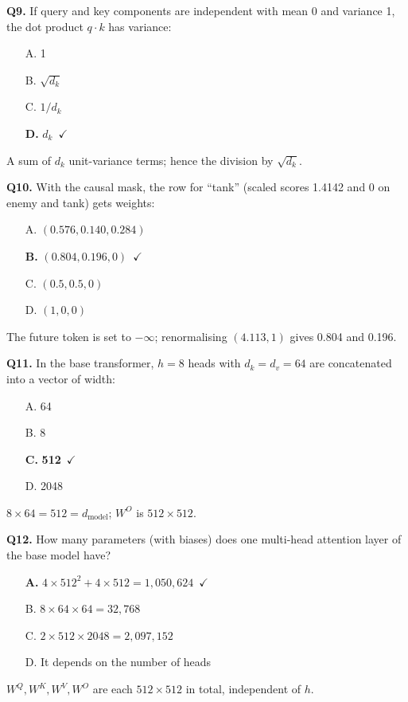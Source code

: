 \documentclass[11pt]{article}
\begin{document}
{\noindent\textbf{Q9.} If query and key components are independent with mean 0 and variance 1, the dot product $q\cdot k$ has variance:\begin{itemize}[leftmargin=2.2em,itemsep=0pt,topsep=1pt]\item[A.] 1\item[B.] $\sqrt{d_k}$\item[C.] $1/d_k$\item[\textbf{D.}] \textbf{$d_k$}~{\color{GrnN}$\checkmark$}\end{itemize} A sum of $d_k$ unit-variance terms; hence the division by $\sqrt{d_k}$.\par\medskip

\noindent\textbf{Q10.} With the causal mask, the row for ``tank'' (scaled scores 1.4142 and 0 on enemy and tank) gets weights:\begin{itemize}[leftmargin=2.2em,itemsep=0pt,topsep=1pt]\item[A.] $(0.576,0.140,0.284)$\item[\textbf{B.}] \textbf{$(0.804,0.196,0)$}~{\color{GrnN}$\checkmark$}\item[C.] $(0.5,0.5,0)$\item[D.] $(1,0,0)$\end{itemize} The future token is set to $-\infty$; renormalising $(4.113,1)$ gives 0.804 and 0.196.\par\medskip

\noindent\textbf{Q11.} In the base transformer, $h=8$ heads with $d_k=d_v=64$ are concatenated into a vector of width:\begin{itemize}[leftmargin=2.2em,itemsep=0pt,topsep=1pt]\item[A.] 64\item[B.] 8\item[\textbf{C.}] \textbf{512}~{\color{GrnN}$\checkmark$}\item[D.] 2048\end{itemize} $8\times64=512=d_{\text{model}}$; $W^O$ is $512\times512$.\par\medskip

\noindent\textbf{Q12.} How many parameters (with biases) does one multi-head attention layer of the base model have?\begin{itemize}[leftmargin=2.2em,itemsep=0pt,topsep=1pt]\item[\textbf{A.}] \textbf{$4\times512^2+4\times512=1{,}050{,}624$}~{\color{GrnN}$\checkmark$}\item[B.] $8\times64\times64=32{,}768$\item[C.] $2\times512\times2048=2{,}097{,}152$\item[D.] It depends on the number of heads\end{itemize} $W^Q,W^K,W^V,W^O$ are each $512\times512$ in total, independent of $h$.\par\medskip

}
\end{document}
